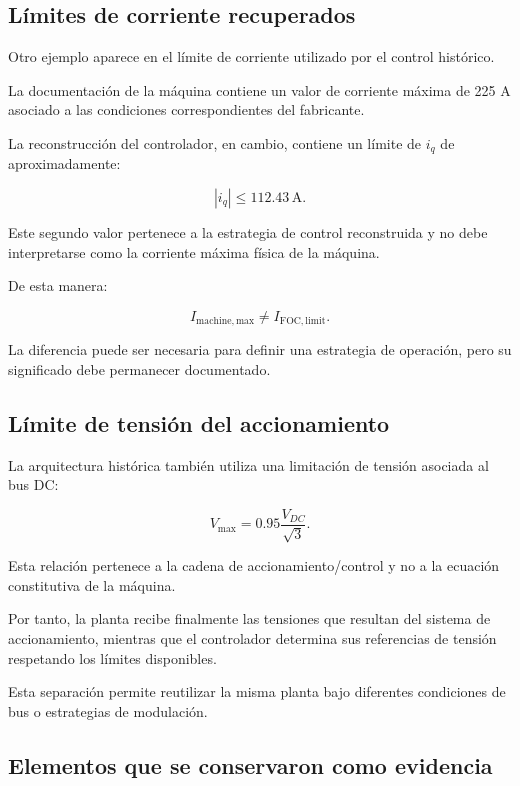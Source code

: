 \subsection{Límites de corriente recuperados}

Otro ejemplo aparece en el límite de corriente utilizado por el control histórico.

La documentación de la máquina contiene un valor de corriente máxima de 225 A asociado a las condiciones correspondientes del fabricante.

La reconstrucción del controlador, en cambio, contiene un límite de $i_q$ de aproximadamente:

\begin{equation}
|i_q|\leq112.43\,\mathrm{A}.
\end{equation}

Este segundo valor pertenece a la estrategia de control reconstruida y no debe interpretarse como la corriente máxima física de la máquina.

De esta manera:

\begin{equation}
I_{\mathrm{machine,max}}
\neq
I_{\mathrm{FOC,limit}}.
\end{equation}

La diferencia puede ser necesaria para definir una estrategia de operación, pero su significado debe permanecer documentado.

\subsection{Límite de tensión del accionamiento}

La arquitectura histórica también utiliza una limitación de tensión asociada al bus DC:

\begin{equation}
V_{\max}
=
0.95
\frac{V_{DC}}{\sqrt{3}}.
\end{equation}

Esta relación pertenece a la cadena de accionamiento/control y no a la ecuación constitutiva de la máquina.

Por tanto, la planta recibe finalmente las tensiones que resultan del sistema de accionamiento, mientras que el controlador determina sus referencias de tensión respetando los límites disponibles.

Esta separación permite reutilizar la misma planta bajo diferentes condiciones de bus o estrategias de modulación.

\subsection{Elementos que se conservaron como evidencia}

